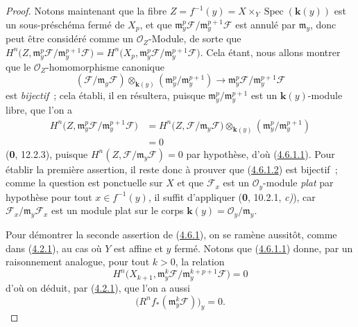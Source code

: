 \begin{proof}
Notons maintenant que la fibre
$Z=f^{-1}(y)=X\times_Y\operatorname{Spec}(\boldsymbol{k}(y))$ est un sous-préschéma fermé
de $X_p$, et que
$\mathfrak m_y^p\mathcal F/\mathfrak m_y^{p+1}\mathcal F$ est annulé par
$\mathfrak m_y$, donc peut être considéré comme un $\mathcal O_Z$-Module, de
sorte que
$H^n\bigl(Z,\mathfrak m_y^p\mathcal F/
\mathfrak m_y^{p+1}\mathcal F\bigr)
=H^n\bigl(X_p,\mathfrak m_y^p\mathcal F/
\mathfrak m_y^{p+1}\mathcal F\bigr)$.
Cela étant, nous allons montrer que le $\mathcal O_Z$-homomorphisme canonique
\[
\label{III.4.6.1.2-fr}
(\mathcal F/\mathfrak m_y\mathcal F)
\otimes_{\mathbf{k}(y)}(\mathfrak m_y^p/\mathfrak m_y^{p+1})
\longrightarrow
\mathfrak m_y^p\mathcal F/\mathfrak m_y^{p+1}\mathcal F
\tag{4.6.1.2}
\]
est \emph{bijectif}~; cela établi, il en résultera, puisque
$\mathfrak m_y^p/\mathfrak m_y^{p+1}$ est un $\boldsymbol{k}(y)$-module libre, que l'on a
\[
\begin{split}
H^n\bigl(Z,\mathfrak m_y^p\mathcal F/
\mathfrak m_y^{p+1}\mathcal F\bigr)
&=H^n\bigl(Z,\mathcal F/\mathfrak m_y\mathcal F\bigr)
\otimes_{\mathbf{k}(y)}(\mathfrak m_y^p/\mathfrak m_y^{p+1})\\
&=0
\end{split}
\]
(\textbf{0}, 12.2.3), puisque
$H^n(Z,\mathcal F/\mathfrak m_y\mathcal F)=0$ par hypothèse, d'où
(\hyperref[III.4.6.1.1-fr]{4.6.1.1}). Pour établir la première assertion, il
reste donc à prouver que (\hyperref[III.4.6.1.2-fr]{4.6.1.2}) est bijectif~;
comme la question est ponctuelle sur $X$ et que $\mathcal F_x$ est un
$\mathcal O_y$-module \emph{plat} par hypothèse pour tout $x\in f^{-1}(y)$, il
suffit d'appliquer (\textbf{0}, 10.2.1, \emph{c)}), car
$\mathcal F_x/\mathfrak m_y\mathcal F_x$ est un module plat sur le corps
$\boldsymbol{k}(y)=\mathcal O_y/\mathfrak m_y$.

Pour démontrer la seconde assertion de (\hyperref[III.4.6.1-fr]{4.6.1}), on
se ramène aussitôt, comme dans (\hyperref[III.4.2.1-fr]{4.2.1}), au cas où
$Y$ est affine et $y$ fermé. Notons que
(\hyperref[III.4.6.1.1-fr]{4.6.1.1}) donne, par un raisonnement analogue,
pour tout $k>0$, la relation
\[
\label{III.4.6.1.3-fr}
H^n\bigl(X_{k+1},
\mathfrak m_y^k\mathcal F/
\mathfrak m_y^{k+p+1}\mathcal F\bigr)=0
\tag{4.6.1.3}
\]
d'où on déduit, par (\hyperref[III.4.2.1-fr]{4.2.1}), que l'on a aussi
\[
\label{III.4.6.1.4-fr}
\bigl(R^nf_*(\mathfrak m_y^k\mathcal F)\bigr)_y=0.
\tag{4.6.1.4}
\]


\end{proof}
